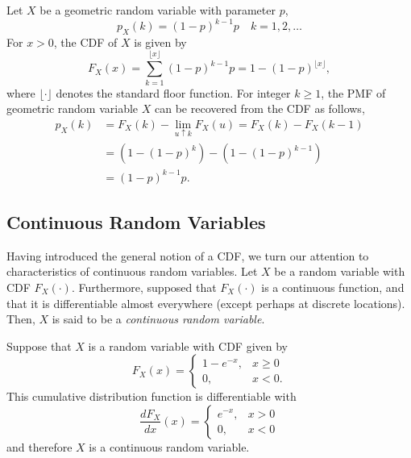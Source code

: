 \begin{example}
Let $X$ be a geometric random variable with parameter $p$,
\begin{equation*}
p_X (k) = (1 - p)^{k-1} p \quad k = 1, 2, \ldots 
\end{equation*}
For $x > 0$, the CDF of $X$ is given by
\begin{equation*}
F_X (x) = \sum_{k = 1}^{\lfloor x \rfloor} (1 - p)^{k-1} p
= 1 - (1 - p)^{\lfloor x \rfloor} ,
\end{equation*}
where $\lfloor \cdot \rfloor$ denotes the standard floor function.
For integer $k \geq 1$, the PMF of geometric random variable $X$ can be recovered from the CDF as follows,
\begin{equation*}
\begin{split}
p_X (k) &= F_X (k) - \lim_{u \uparrow k} F_X (u) = F_X (k) - F_X (k-1) \\
&= \left( 1 - (1-p)^k \right) - \left( 1 - (1-p)^{k-1} \right) \\
&= (1 - p)^{k-1} p .
\end{split}
\end{equation*}
\end{example}


\subsection{Continuous Random Variables}

Having introduced the general notion of a CDF, we turn our attention to characteristics of continuous random variables.
Let $X$ be a random variable with CDF $F_X (\cdot)$.
Furthermore, supposed that $F_X (\cdot)$ is a continuous function, and that it is differentiable almost everywhere (except perhaps at discrete locations).
Then, $X$ is said to be a \emph{continuous random variable}. 

\begin{example}
Suppose that $X$ is a random variable with CDF given by
\begin{equation*}
F_X(x) = \begin{cases} 1 - e^{-x}, & x \geq 0 \\
0, & x < 0 . \end{cases}
\end{equation*}
This cumulative distribution function is differentiable with
\begin{equation*}
\frac{dF_X}{dx}(x)
= \begin{cases} e^{-x}, & x > 0 \\
0, & x < 0 \end{cases}
\end{equation*}
and therefore $X$ is a continuous random variable.
\end{example}

